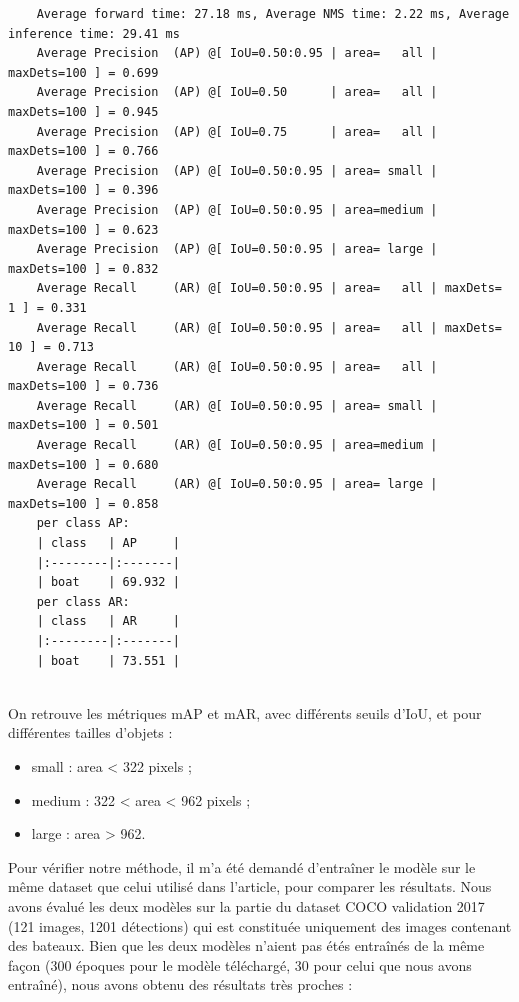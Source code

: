 \begin{verbatim}
    Average forward time: 27.18 ms, Average NMS time: 2.22 ms, Average inference time: 29.41 ms 
    Average Precision  (AP) @[ IoU=0.50:0.95 | area=   all | maxDets=100 ] = 0.699 
    Average Precision  (AP) @[ IoU=0.50      | area=   all | maxDets=100 ] = 0.945 
    Average Precision  (AP) @[ IoU=0.75      | area=   all | maxDets=100 ] = 0.766 
    Average Precision  (AP) @[ IoU=0.50:0.95 | area= small | maxDets=100 ] = 0.396 
    Average Precision  (AP) @[ IoU=0.50:0.95 | area=medium | maxDets=100 ] = 0.623 
    Average Precision  (AP) @[ IoU=0.50:0.95 | area= large | maxDets=100 ] = 0.832 
    Average Recall     (AR) @[ IoU=0.50:0.95 | area=   all | maxDets=  1 ] = 0.331 
    Average Recall     (AR) @[ IoU=0.50:0.95 | area=   all | maxDets= 10 ] = 0.713 
    Average Recall     (AR) @[ IoU=0.50:0.95 | area=   all | maxDets=100 ] = 0.736 
    Average Recall     (AR) @[ IoU=0.50:0.95 | area= small | maxDets=100 ] = 0.501 
    Average Recall     (AR) @[ IoU=0.50:0.95 | area=medium | maxDets=100 ] = 0.680 
    Average Recall     (AR) @[ IoU=0.50:0.95 | area= large | maxDets=100 ] = 0.858 
    per class AP: 
    | class   | AP     | 
    |:--------|:-------| 
    | boat    | 69.932 | 
    per class AR: 
    | class   | AR     | 
    |:--------|:-------| 
    | boat    | 73.551 | 
    
\end{verbatim}

On retrouve les métriques mAP et mAR, avec différents seuils d'IoU, et pour différentes tailles d'objets : 

\begin{itemize}
    \item small : area < 322 pixels ; 
    \item medium : 322 < area < 962 pixels ;
    \item large : area > 962.
\end{itemize}

Pour vérifier notre méthode, il m'a été demandé d'entraîner le modèle sur le même dataset que celui utilisé
dans l'article, pour comparer les résultats. Nous avons évalué les deux modèles sur la partie du dataset 
COCO validation 2017 (121 images, 1201 détections) qui est constituée uniquement des images 
contenant des bateaux. 
Bien que les deux modèles n'aient pas étés entraînés de la même façon (300 époques pour le modèle téléchargé,
30 pour celui que nous avons entraîné), nous avons obtenu des résultats très proches : 


